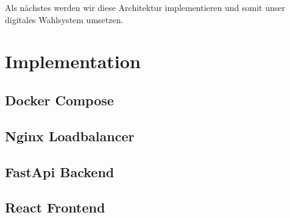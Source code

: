 \documentclass{article}  %
\begin{document}
Als nächstes werden wir diese Architektur implementieren und somit unser digitales Wahlsystem umsetzen.



\newpage
\section{Implementation}
\subsection{Docker Compose}
\subsection{Nginx Loadbalancer}
\subsection{FastApi Backend}
\subsection{React Frontend}
\newpage
\end{document}

